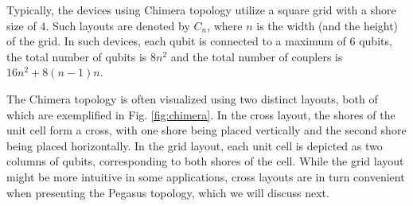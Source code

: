 Typically, the devices using Chimera topology utilize a square grid with a
shore size of $4$. Such layouts are denoted by $C_n$, where $n$ is the width
(and the height) of the grid. In such devices, each qubit is connected to a
maximum of 6 qubits, the total number of qubits is $8n^2$ and the total number
of couplers is $16n^2 + 8(n-1)n$.

The Chimera topology is often visualized using two distinct layouts, both of
which are exemplified in Fig. \ref{fig:chimera}. In the cross layout, the
shores of the unit cell form a cross, with one shore being placed vertically
and the second shore being placed horizontally. In the grid layout, each unit
cell is depicted as two columns of qubits, corresponding to both shores of the
cell. While the grid layout might be more intuitive in some applications, cross
layouts are in turn convenient when presenting the Pegasus topology, which we
will discuss next.

